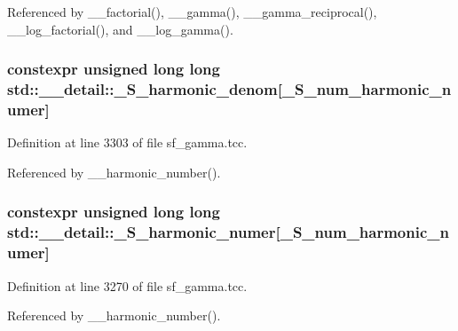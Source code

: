 Referenced by \+\_\+\+\_\+factorial(), \+\_\+\+\_\+gamma(), \+\_\+\+\_\+gamma\+\_\+reciprocal(), \+\_\+\+\_\+log\+\_\+factorial(), and \+\_\+\+\_\+log\+\_\+gamma().

\subsubsection[{\texorpdfstring{\+\_\+\+S\+\_\+harmonic\+\_\+denom}{_S_harmonic_denom}}]{\setlength{\rightskip}{0pt plus 5cm}constexpr unsigned long long std\+::\+\_\+\+\_\+detail\+::\+\_\+\+S\+\_\+harmonic\+\_\+denom\mbox{[}{\bf \+\_\+\+S\+\_\+num\+\_\+harmonic\+\_\+numer}\mbox{]}}\hypertarget{namespacestd_1_1____detail_ad2bdb66d93fa4433097b287c7899cd1e}{}\label{namespacestd_1_1____detail_ad2bdb66d93fa4433097b287c7899cd1e}


Definition at line 3303 of file sf\+\_\+gamma.\+tcc.



Referenced by \+\_\+\+\_\+harmonic\+\_\+number().

\subsubsection[{\texorpdfstring{\+\_\+\+S\+\_\+harmonic\+\_\+numer}{_S_harmonic_numer}}]{\setlength{\rightskip}{0pt plus 5cm}constexpr unsigned long long std\+::\+\_\+\+\_\+detail\+::\+\_\+\+S\+\_\+harmonic\+\_\+numer\mbox{[}{\bf \+\_\+\+S\+\_\+num\+\_\+harmonic\+\_\+numer}\mbox{]}}\hypertarget{namespacestd_1_1____detail_a3976bb1731d7ecfaba4601d1083d7cf6}{}\label{namespacestd_1_1____detail_a3976bb1731d7ecfaba4601d1083d7cf6}


Definition at line 3270 of file sf\+\_\+gamma.\+tcc.



Referenced by \+\_\+\+\_\+harmonic\+\_\+number().

